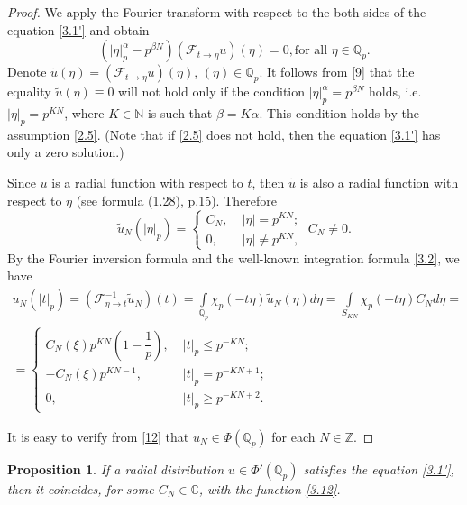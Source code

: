 \documentclass[14pt]{article}
\theoremstyle{theorem}
\theoremstyle{theorem}
\newtheorem{proposition}{Proposition}[section]
\theoremstyle{definition}
\theoremstyle{lemma}
\newcommand{\Label}[1]{\label{#1}}
\numberwithin{equation}{section}
\begin{document}
\begin{proof}
We apply the Fourier transform with respect to the both sides of the equation \eqref{3.1'} and obtain
\begin{equation}\Label{9}
(|\eta|_p^{\alpha}-p^{\beta N})(\mathcal{F}_{t\to\eta}u)(\eta)=0,\mbox{for all }\eta\in\mathbb{Q}_p.
\end{equation}
Denote $\widetilde{u}(\eta)=(\mathcal{F}_{t\to\eta}u)(\eta)$, $(\eta)\in\mathbb{Q}_p$. It follows from \eqref{9} that the equality $\widetilde{u}(\eta)\equiv0$ will not hold only if the condition $|\eta|_p^{\alpha}=p^{\beta N}$ holds, i.e. $|\eta|_p=p^{KN}$, where $K\in\mathbb{N}$ is such that $\beta=K\alpha$. This condition holds by the assumption \eqref{2.5}. (Note that if \eqref{2.5} does not hold, then the equation \eqref{3.1'} has only a zero solution.)

Since $u$ is a radial function with respect to $t$, then $\widetilde{u}$ is also a radial function with respect to $\eta$ (see \cite{K2001} formula (1.28), p.15). Therefore
\begin{equation}\Label{11}
\widetilde{u}_N(|\eta|_p)=\left\{
\begin{array}{ll}
C_N,\;&|\eta|=p^{KN};\\
0,\;&|\eta|\neq p^{KN},
\end{array}
\right.
\;C_N\neq0.
\end{equation}
By the Fourier inversion formula and the well-known integration formula \eqref{3.2}, we have
\begin{equation}\Label{12}
\begin{split}
u_N(|t|_p)=(\mathcal{F}_{\eta\to t}^{-1}\widetilde{u}_N)(t)=\int\limits_{\mathbb{Q}_p}\chi_p(-t\eta)\widetilde{u}_N(\eta)d\eta=\int\limits_{S_{KN}}\chi_p(-t\eta)C_Nd\eta=\\
=\left\{
\begin{array}{ll}
C_N(\xi)p^{KN}(1-\dfrac{1}{p}),\;&|t|_p\leq p^{-KN};\\
-C_N(\xi)p^{KN-1},\;&|t|_p=p^{-KN+1};\\
0,\;&|t|_p\geq p^{-KN+2}.
\end{array}
\right.
\end{split}
\end{equation}

It is easy to verify from \eqref{12} that $u_N\in\Phi(\mathbb{Q}_p)$ for each $N\in\mathbb{Z}$.
\end{proof}

\begin{proposition}\Label{Pr2}
If a radial distribution $u\in\Phi'(\mathbb{Q}_p)$ satisfies the equation \eqref{3.1'}, then it coincides, for some $C_N\in\mathbb{C}$, with the function \eqref{3.12}.
\end{proposition}
\end{document}
